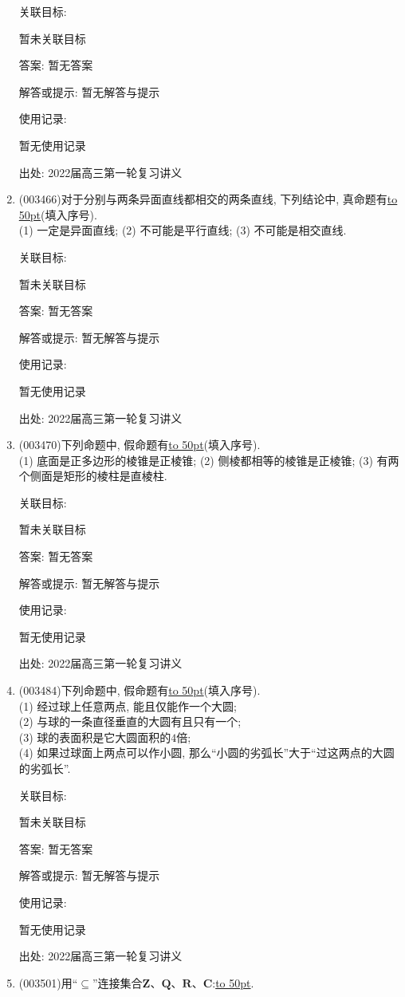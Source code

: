 \documentclass[10pt,a4paper]{article}
\newcommand{\blank}[1]{\underline{\hbox to #1pt{}}}
\begin{document}
\begin{enumerate}[1.]
关联目标:

暂未关联目标

答案: 暂无答案

解答或提示: 暂无解答与提示

使用记录:

暂无使用记录


出处: 2022届高三第一轮复习讲义
\item { (003466)}对于分别与两条异面直线都相交的两条直线, 下列结论中, 真命题有\blank{50}(填入序号).\\
(1) 一定是异面直线; (2) 不可能是平行直线; (3) 不可能是相交直线.


关联目标:

暂未关联目标

答案: 暂无答案

解答或提示: 暂无解答与提示

使用记录:

暂无使用记录


出处: 2022届高三第一轮复习讲义
\item { (003470)}下列命题中, 假命题有\blank{50}(填入序号).\\
(1) 底面是正多边形的棱锥是正棱锥; (2) 侧棱都相等的棱锥是正棱锥; (3) 有两个侧面是矩形的棱柱是直棱柱.


关联目标:

暂未关联目标

答案: 暂无答案

解答或提示: 暂无解答与提示

使用记录:

暂无使用记录


出处: 2022届高三第一轮复习讲义
\item { (003484)}下列命题中, 假命题有\blank{50}(填入序号).\\
(1) 经过球上任意两点, 能且仅能作一个大圆;\\
(2) 与球的一条直径垂直的大圆有且只有一个;\\
(3) 球的表面积是它大圆面积的$4$倍;\\
(4) 如果过球面上两点可以作小圆, 那么``小圆的劣弧长''大于``过这两点的大圆的劣弧长''.


关联目标:

暂未关联目标

答案: 暂无答案

解答或提示: 暂无解答与提示

使用记录:

暂无使用记录


出处: 2022届高三第一轮复习讲义
\item { (003501)}用``$\subseteq$''连接集合$\mathbf{Z}$、$\mathbf{Q}$、$\mathbf{R}$、$\mathbf{C}$:\blank{50}.



\end{enumerate}
\end{document}
